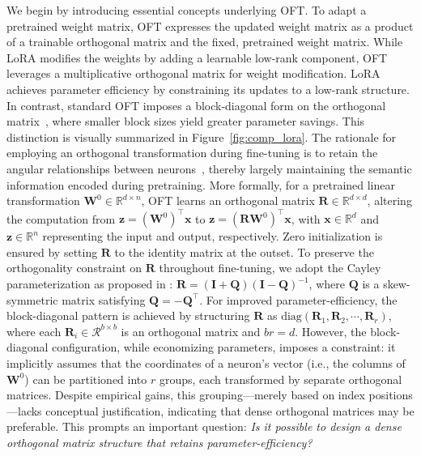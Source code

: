 We begin by introducing essential concepts underlying OFT. To adapt a pretrained weight matrix, OFT expresses the updated weight matrix as a product of a trainable orthogonal matrix and the fixed, pretrained weight matrix. While LoRA modifies the weights by adding a learnable low-rank component, OFT leverages a multiplicative orthogonal matrix for weight modification. LoRA achieves parameter efficiency by constraining its updates to a low-rank structure. In contrast, standard OFT imposes a block-diagonal form on the orthogonal matrix~\cite{qiu2023controlling}, where smaller block sizes yield greater parameter savings. This distinction is visually summarized in Figure~\ref{fig:comp_lora}. The rationale for employing an orthogonal transformation during fine-tuning is to retain the angular relationships between neurons~\cite{liu2018learning,liu2021orthogonal,qiu2023controlling}, thereby largely maintaining the semantic information encoded during pretraining. More formally, for a pretrained linear transformation $\bm{W}^0\in\mathbb{R}^{d\times n}$, OFT learns an orthogonal matrix $\bm{R}\in\mathbb{R}^{d\times d}$, altering the computation from $\bm{z}=(\bm{W}^0)^\top\bm{x}$ to $\bm{z}=(\bm{R}\bm{W}^0)^\top\bm{x}$, with $\bm{x}\in\mathbb{R}^{d}$ and $\bm{z}\in\mathbb{R}^{n}$ representing the input and output, respectively. Zero initialization is ensured by setting $\bm{R}$ to the identity matrix at the outset. To preserve the orthogonality constraint on $\bm{R}$ throughout fine-tuning, we adopt the Cayley parameterization as proposed in \cite{qiu2023controlling,liu2021orthogonal}: $\bm{R}=(\bm{I}+\bm{Q})(\bm{I}-\bm{Q})^{-1}$, where $\bm{Q}$ is a skew-symmetric matrix satisfying $\bm{Q}=-\bm{Q}^\top$. For improved parameter-efficiency, the block-diagonal pattern is achieved by structuring $\bm{R}$ as $\text{diag}(\bm{R}_1,\bm{R}_2,\cdots,\bm{R}_r)$, where each $\bm{R}_i\in\mathcal{R}^{b\times b}$ is an orthogonal matrix and $br=d$. However, the block-diagonal configuration, while economizing parameters, imposes a constraint: it implicitly assumes that the coordinates of a neuron's vector (i.e., the columns of $\bm{W}^0$) can be partitioned into $r$ groups, each transformed by separate orthogonal matrices. Despite empirical gains, this grouping—merely based on index positions—lacks conceptual justification, indicating that dense orthogonal matrices may be preferable. This prompts an important question: \emph{Is it possible to design a dense orthogonal matrix structure that retains parameter-efficiency?}

